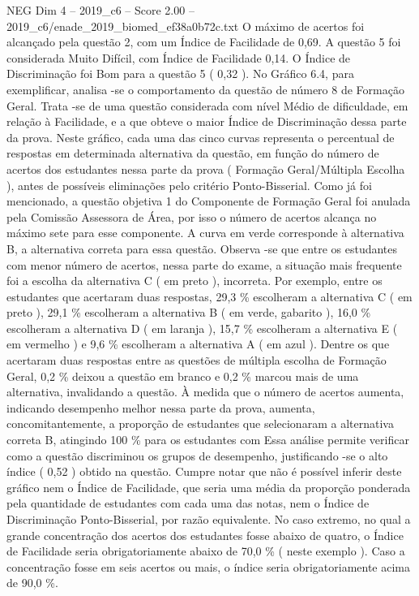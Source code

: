 \begin{textsample}{NEG Dim 4 – 2019\_c6 – Score 2.00 – 2019\_c6/enade\_2019\_biomed\_ef38a0b72c.txt}
O máximo de acertos foi alcançado pela questão 2, com um Índice de Facilidade de 0,69.
A questão 5 foi considerada Muito Difícil, com Índice de Facilidade 0,14.
O Índice de Discriminação foi Bom para a questão 5 ( 0,32 ).
No Gráfico 6.4, para exemplificar, analisa -se o comportamento da questão de número 8 de Formação Geral.
Trata -se de uma questão considerada com nível Médio de dificuldade, em relação à Facilidade, e a que obteve o maior Índice de Discriminação dessa parte da prova.
Neste gráfico, cada uma das cinco curvas representa o percentual de respostas em determinada alternativa da questão, em função do número de acertos dos estudantes nessa parte da prova ( Formação Geral/Múltipla Escolha ), antes de possíveis eliminações pelo critério Ponto-Bisserial.
Como já foi mencionado, a questão objetiva 1 do Componente de Formação Geral foi anulada pela Comissão Assessora de Área, por isso o número de acertos alcança no máximo sete para esse componente.
A curva em verde corresponde à alternativa B, a alternativa correta para essa questão.
Observa -se que entre os estudantes com menor número de acertos, nessa parte do exame, a situação mais frequente foi a escolha da alternativa C ( em preto ), incorreta.
Por exemplo, entre os estudantes que acertaram duas respostas, 29,3 \% escolheram a alternativa C ( em preto ), 29,1 \% escolheram a alternativa B ( em verde, gabarito ), 16,0 \% escolheram a alternativa D ( em laranja ), 15,7 \% escolheram a alternativa E ( em vermelho ) e 9,6 \% escolheram a alternativa A ( em azul ).
Dentre os que acertaram duas respostas entre as questões de múltipla escolha de Formação Geral, 0,2 \% deixou a questão em branco e 0,2 \% marcou mais de uma alternativa, invalidando a questão.
À medida que o número de acertos aumenta, indicando desempenho melhor nessa parte da prova, aumenta, concomitantemente, a proporção de estudantes que selecionaram a alternativa correta B, atingindo 100 \% para os estudantes com Essa análise permite verificar como a questão discriminou os grupos de desempenho, justificando -se o alto índice ( 0,52 ) obtido na questão.
Cumpre notar que não é possível inferir deste gráfico nem o Índice de Facilidade, que seria uma média da proporção ponderada pela quantidade de estudantes com cada uma das notas, nem o Índice de Discriminação Ponto-Bisserial, por razão equivalente.
No caso extremo, no qual a grande concentração dos acertos dos estudantes fosse abaixo de quatro, o Índice de Facilidade seria obrigatoriamente abaixo de 70,0 \% ( neste exemplo ).
Caso a concentração fosse em seis acertos ou mais, o índice seria obrigatoriamente acima de 90,0 \%.

\end{textsample}
